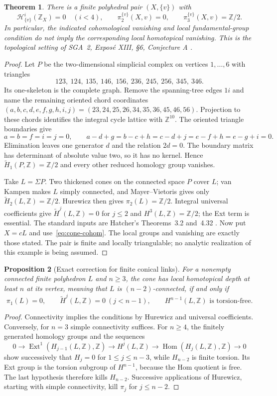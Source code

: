 \documentclass[11pt,a4paper]{article}
\newtheorem{theorem}{Theorem}[section]
\newtheorem{proposition}[theorem]{Proposition}
\theoremstyle{definition}
\newcommand{\Hom}{\operatorname{Hom}}
\newcommand{\Z}{\mathbb Z}
\begin{document}
\begin{theorem}\label{thm:local-hurewicz}
There is a finite polyhedral pair $(X,\{v\})$ with
\[
 \mathcal H^i_{\{v\}}(\Z_X)=0\quad(i<4),\qquad
 \pi_2^{\{v\}}(X,v)=0,\qquad
 \pi_3^{\{v\}}(X,v)=\Z/2.
\]
In particular, the indicated cohomological vanishing and local fundamental-group condition do not imply the corresponding local homotopical vanishing. This is the topological setting of SGA~2, Expos\'e XIII, \S6, Conjecture A \cite{SGA2}.
\end{theorem}
\begin{proof}
Let $P$ be the two-dimensional simplicial complex on vertices $1,\ldots,6$ with triangles
\[
 123,\ 124,\ 135,\ 146,\ 156,\
 236,\ 245,\ 256,\ 345,\ 346.
\]
Its one-skeleton is the complete graph. Remove the spanning-tree edges $1i$ and name the remaining oriented chord coordinates
$(a,b,c,d,e,f,g,h,i,j)=(23,24,25,26,34,35,36,45,46,56)$.
Projection to these chords identifies the integral cycle lattice with $\Z^{10}$. The oriented triangle boundaries give
\[
 a=b=f=i=j=0,\qquad
 a-d+g=b-c+h=c-d+j=e-f+h=e-g+i=0.
\]
Elimination leaves one generator $d$ and the relation $2d=0$. The boundary matrix has determinant of absolute value two, so it has no kernel. Hence $\widetilde H_1(P,\Z)=\Z/2$ and every other reduced homology group vanishes.

Take $L=\Sigma P$. Two thickened cones on the connected space $P$ cover $L$; van Kampen makes $L$ simply connected, and Mayer--Vietoris gives only $\widetilde H_2(L,\Z)=\Z/2$. Hurewicz then gives $\pi_2(L)=\Z/2$. Integral universal coefficients give $\widetilde H^j(L,\Z)=0$ for $j\le2$ and $H^3(L,\Z)=\Z/2$; the Ext term is essential. The standard inputs are Hatcher's Theorems~3.2 and~4.32 \cite{Hatcher}. Now put $X=cL$ and use~\eqref{eq:cone-cohom}. The local groups and vanishing are exactly those stated. The pair is finite and locally triangulable; no analytic realization of this example is being assumed.
\end{proof}

\begin{proposition}[Exact correction for finite conical links]
For a nonempty connected finite polyhedron $L$ and $n\ge3$, the cone has local homotopical depth at least $n$ at its vertex, meaning that $L$ is $(n-2)$-connected, if and only if
\[
 \pi_1(L)=0,\qquad
 \widetilde H^j(L,\Z)=0\ (j<n-1),\qquad
 H^{n-1}(L,\Z)\text{ is torsion-free}.
\]
\end{proposition}
\begin{proof}
Connectivity implies the conditions by Hurewicz and universal coefficients. Conversely, for $n=3$ simple connectivity suffices. For $n\ge4$, the finitely generated homology groups and the sequences
\[
 0\to\operatorname{Ext}^1(H_{j-1}(L,\Z),\Z)
 \to H^j(L,\Z)\to\Hom(H_j(L,\Z),\Z)\to0
\]
show successively that $H_j=0$ for $1\le j\le n-3$, while $H_{n-2}$ is finite torsion. Its Ext group is the torsion subgroup of $H^{n-1}$, because the Hom quotient is free. The last hypothesis therefore kills $H_{n-2}$. Successive applications of Hurewicz, starting with simple connectivity, kill $\pi_j$ for $j\le n-2$.
\end{proof}
\end{document}
